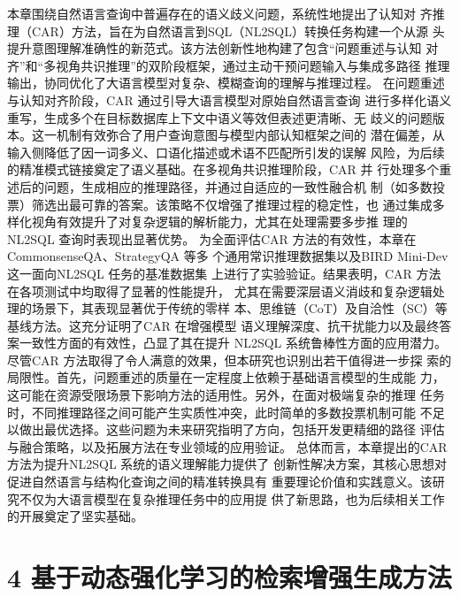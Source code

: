 \documentclass[12pt,a4paper,openright,UTF8]{ctexbook}
\begin{document}
本章围绕自然语言查询中普遍存在的语义歧义问题，系统性地提出了认知对 齐推理（CAR）方法，旨在为自然语言到SQL（NL2SQL）转换任务构建一个从源 头提升意图理解准确性的新范式。该方法创新性地构建了包含“问题重述与认知 对齐”和“多视角共识推理”的双阶段框架，通过主动干预问题输入与集成多路径 推理输出，协同优化了大语言模型对复杂、模糊查询的理解与推理过程。 在问题重述与认知对齐阶段，CAR 通过引导大语言模型对原始自然语言查询 进行多样化语义重写，生成多个在目标数据库上下文中语义等效但表述更清晰、无 歧义的问题版本。这一机制有效弥合了用户查询意图与模型内部认知框架之间的 潜在偏差，从输入侧降低了因一词多义、口语化描述或术语不匹配所引发的误解 风险，为后续的精准模式链接奠定了语义基础。在多视角共识推理阶段，CAR 并 行处理多个重述后的问题，生成相应的推理路径，并通过自适应的一致性融合机 制（如多数投票）筛选出最可靠的答案。该策略不仅增强了推理过程的稳定性，也 通过集成多样化视角有效提升了对复杂逻辑的解析能力，尤其在处理需要多步推 理的NL2SQL 查询时表现出显著优势。 为全面评估CAR 方法的有效性，本章在CommonsenseQA、StrategyQA 等多 个通用常识推理数据集以及BIRD Mini-Dev 这一面向NL2SQL 任务的基准数据集 上进行了实验验证。结果表明，CAR 方法在各项测试中均取得了显著的性能提升， 尤其在需要深层语义消歧和复杂逻辑处理的场景下，其表现显著优于传统的零样 本、思维链（CoT）及自洽性（SC）等基线方法。这充分证明了CAR 在增强模型 语义理解深度、抗干扰能力以及最终答案一致性方面的有效性，凸显了其在提升 NL2SQL 系统鲁棒性方面的应用潜力。 尽管CAR 方法取得了令人满意的效果，但本研究也识别出若干值得进一步探 索的局限性。首先，问题重述的质量在一定程度上依赖于基础语言模型的生成能 力，这可能在资源受限场景下影响方法的适用性。另外，在面对极端复杂的推理 任务时，不同推理路径之间可能产生实质性冲突，此时简单的多数投票机制可能 不足以做出最优选择。这些问题为未来研究指明了方向，包括开发更精细的路径 评估与融合策略，以及拓展方法在专业领域的应用验证。 总体而言，本章提出的CAR 方法为提升NL2SQL 系统的语义理解能力提供了 创新性解决方案，其核心思想对促进自然语言与结构化查询之间的精准转换具有 重要理论价值和实践意义。该研究不仅为大语言模型在复杂推理任务中的应用提 供了新思路，也为后续相关工作的开展奠定了坚实基础。

\chapter{4 基于动态强化学习的检索增强生成方法}
\end{document}
